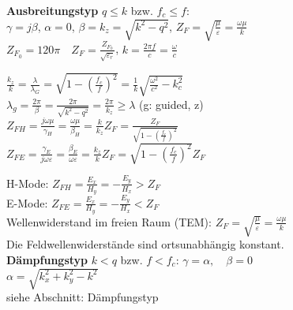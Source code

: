 \documentclass[english]{latex4ei/latex4ei_sheet}
\begin{document}
\begin{sectionbox}
    \textbf{Ausbreitungstyp} $q\leq k$ bzw. $f_c \leq f$:\\
    $\gamma = j\beta$, $\alpha=0$, $\beta = k_z = \sqrt{k^2 - q^2}$, $Z_F = \sqrt{\frac{\mu}{\varepsilon}} = \frac{\omega\mu}{k}$\\
    $Z_{F_0} = 120\pi \quad Z_F = \frac{Z_{F_0}}{\sqrt{\varepsilon_r}}$,
    $k=\frac{2 \pi f}{c}= \frac{\omega}{c}$
    \begin{emphbox}
        $\frac{k_z}{k} = \frac{\lambda}{\lambda_G} = \sqrt{1- \left(\frac{f_c}{f}\right)^2}=\frac{1}{k}\sqrt{\frac{\omega^{2}}{c^{2}}-k_{c}^{2}}$\\
        $\lambda_{g}=\frac{2 \pi}{\beta}=\frac{2 \pi}{\sqrt{k^{2}-q^{2}}} =\frac{2 \pi}{k_z}\geq \lambda$ (g: guided, z)\\
        $Z_{F H} = \frac{j \omega \mu}{\gamma_{H}}=\frac{\omega \mu}{\beta_{H}}=\frac{k}{k_z}Z_F=\frac{Z_{F}}{\sqrt{1 - \left(\frac{f_c}{f}\right)^2}}$\\
        $Z_{F E} = \frac{\gamma_{E}}{j \omega \varepsilon}=\frac{\beta_{E}}{\omega \varepsilon}=\frac{k_z}{k}Z_F=\sqrt{1 - \left(\frac{f_c}{f}\right)^2}Z_{F}$\\
    \end{emphbox}
    H-Mode: $Z_{F H} = \frac{E_x}{H_y} = -\frac{E_y}{H_x} > Z_F$\\
    E-Mode: $Z_{F E} = \frac{E_x}{H_y} = -\frac{E_y}{H_x} < Z_F$\\
    Wellenwiderstand im freien Raum (TEM): $Z_F = \sqrt{\frac{\mu}{\varepsilon}} = \frac{\omega\mu}{k}$\\
    Die Feldwellenwiderstände sind ortsunabhängig konstant.\\

    \textbf{Dämpfungstyp} $k < q$ bzw. $f < f_c$: $\gamma = \alpha, \quad \beta=0$\\
    $\alpha=\sqrt{k_{x}^{2}+k_{y}^{2}-k^{2}}$\\
    siehe Abschnitt: Dämpfungstyp


\end{sectionbox}
\end{document}
